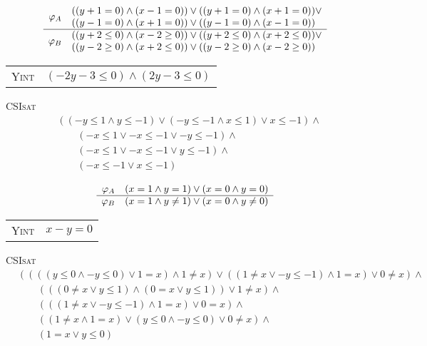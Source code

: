 \bigskip\centerline{}

\[\begin{array}{r l}
\multirow{2}{*}{$\varphi_A$}
& ((y+1=0) \wedge (x-1=0)) \vee ((y+1=0) \wedge (x+1=0)) \vee \\
& ((y-1=0) \wedge (x+1=0)) \vee ((y-1=0) \wedge (x-1=0)) \\
\hline
\multirow{2}{*}{$\varphi_B$}
& ((y+2 \leq 0) \wedge (x-2 \geq 0)) \vee ((y+2 \leq 0) \wedge (x+2 \leq 0)) \vee \\
& ((y-2 \geq 0) \wedge (x+2 \leq 0)) \vee ((y-2 \geq 0) \wedge (x-2 \geq 0))
\end{array}\]
\begin{tabular}{l c}
\textsc{Yint} & $(-2y-3 \leq 0) \wedge (2y-3 \leq 0)$
\end{tabular}

\bigskip\centerline{}

\textsc{CSIsat}
\begin{align*}
& ((-y \leq 1 \wedge y \leq -1) \vee (-y \leq -1 \wedge x \leq 1) \vee x \leq -1) \wedge \\
& \qquad (-x \leq 1 \vee -x \leq -1 \vee -y \leq -1) \wedge \\
& \qquad (-x \leq 1 \vee -x \leq -1 \vee y \leq -1) \wedge \\
& \qquad (-x \leq -1 \vee x \leq -1)
\end{align*}

\[\begin{array}{r l}
\varphi_A & (x=1 \wedge y=1) \vee (x=0 \wedge y=0) \\
\hline
\varphi_B & (x=1 \wedge y \neq 1) \vee (x=0 \wedge y \neq 0)
\end{array}\]
\begin{tabular}{l c}
\textsc{Yint} & $x-y=0$
\end{tabular}

\textsc{CSIsat}
\begin{align*}
& ((((y \leq 0 \wedge -y \leq 0) \vee 1 = x) \wedge 1 \neq x) \vee ((1 \neq x \vee -y \leq -1) \wedge 1 = x) \vee 0 \neq x) \wedge \\
& \qquad (((0 \neq x \vee y \leq 1) \wedge (0 = x \vee y \leq 1)) \vee 1 \neq x) \wedge \\
& \qquad (((1 \neq x \vee -y \leq -1) \wedge 1 = x) \vee 0 = x) \wedge \\
& \qquad ((1 \neq x \wedge 1 = x) \vee (y \leq 0 \wedge -y \leq 0) \vee 0 \neq x) \wedge \\
& \qquad (1 = x \vee y \leq 0)
\end{align*}



